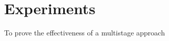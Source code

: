 \chapter{Experiments}
\label{chp:experiments}
To prove the effectiveness of a multistage approach 
\section{}